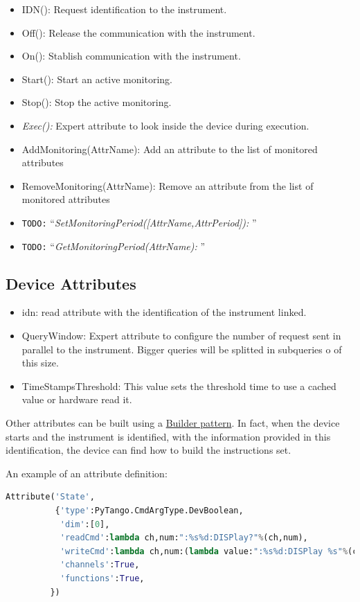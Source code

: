 \documentclass[a4paper,10pt]{article}
\newcommand{\todo}[1]{\texttt{\color{red}TODO:} ``\emph{#1}''}
\begin{document}
\begin{itemize}
    \item IDN(): Request identification to the instrument.
    \item Off(): Release the communication with the instrument.
    \item On(): Stablish communication with the instrument.
    \item Start(): Start an active monitoring.
    \item Stop(): Stop the active monitoring.
    \item \emph{Exec():} Expert attribute to look inside the device during execution.
    \item AddMonitoring(AttrName): Add an attribute to the list of monitored attributes
    \item RemoveMonitoring(AttrName): Remove an attribute from the list of monitored attributes
    \item \todo{SetMonitoringPeriod([AttrName,AttrPeriod]): }
    \item \todo{GetMonitoringPeriod(AttrName): }
\end{itemize}

\subsection{Device Attributes}

\begin{itemize}
    \item idn: read attribute with the identification of the instrument linked.
    \item QueryWindow: Expert attribute to configure the number of request sent in parallel to the instrument. Bigger queries will be splitted in subqueries o of this size.
    \item TimeStampsThreshold: This value sets the threshold time to use a cached value or hardware read it.
\end{itemize}

Other attributes can be built using a \href{http://en.wikipedia.org/wiki/Builder_pattern}{Builder pattern}. In fact, when the device starts and the instrument is identified, with the information provided in this identification, the device can find how to build the instructions set.

An example of an attribute definition:

\begin{lstlisting}[language=python,basicstyle=\footnotesize]
Attribute('State',
          {'type':PyTango.CmdArgType.DevBoolean,
           'dim':[0],
           'readCmd':lambda ch,num:":%s%d:DISPlay?"%(ch,num),
           'writeCmd':lambda ch,num:(lambda value:":%s%d:DISPlay %s"%(ch,num,value)),
           'channels':True,
           'functions':True,
         })
\end{lstlisting}
\end{document}
